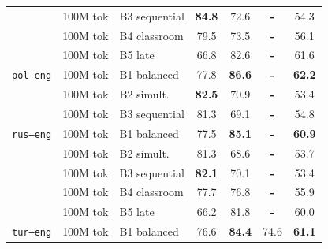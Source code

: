 \documentclass[11pt]{article}
\begin{document}
\begin{table}[ht!]
\begin{minipage}[t]{0.49\linewidth}
\begin{tabular}{ll l cc cc}
 & 100M tok & B3 sequential & \cellcolor[rgb]{0.807,1.000,0.807} \textbf{84.8} & \cellcolor[rgb]{0.877,1.000,0.877} 72.6 & \textbf{-} & \cellcolor[rgb]{0.965,1.000,0.965} 54.3 \\
 & 100M tok & B4 classroom & \cellcolor[rgb]{0.837,1.000,0.837} 79.5 & \cellcolor[rgb]{0.872,1.000,0.872} 73.5 & \textbf{-} & \cellcolor[rgb]{0.950,1.000,0.950} 56.1 \\
 & 100M tok & B5 late & \cellcolor[rgb]{0.907,1.000,0.907} 66.8 & \cellcolor[rgb]{0.822,1.000,0.822} 82.6 & \textbf{-} & \cellcolor[rgb]{0.905,1.000,0.905} 61.6 \\
\midrule
\texttt{pol--eng} & 100M tok & B1 balanced & \cellcolor[rgb]{0.846,1.000,0.846} 77.8 & \cellcolor[rgb]{0.800,1.000,0.800} \textbf{86.6} & \textbf{-} & \cellcolor[rgb]{0.900,1.000,0.900} \textbf{62.2} \\
 & 100M tok & B2 simult. & \cellcolor[rgb]{0.820,1.000,0.820} \textbf{82.5} & \cellcolor[rgb]{0.886,1.000,0.886} 70.9 & \textbf{-} & \cellcolor[rgb]{0.972,1.000,0.972} 53.4 \\
 & 100M tok & B3 sequential & \cellcolor[rgb]{0.827,1.000,0.827} 81.3 & \cellcolor[rgb]{0.896,1.000,0.896} 69.1 & \textbf{-} & \cellcolor[rgb]{0.960,1.000,0.960} 54.8 \\
\midrule
\texttt{rus--eng} & 100M tok & B1 balanced & \cellcolor[rgb]{0.848,1.000,0.848} 77.5 & \cellcolor[rgb]{0.809,1.000,0.809} \textbf{85.1} & \textbf{-} & \cellcolor[rgb]{0.910,1.000,0.910} \textbf{60.9} \\
 & 100M tok & B2 simult. & \cellcolor[rgb]{0.827,1.000,0.827} 81.3 & \cellcolor[rgb]{0.899,1.000,0.899} 68.6 & \textbf{-} & \cellcolor[rgb]{0.970,1.000,0.970} 53.7 \\
 & 100M tok & B3 sequential & \cellcolor[rgb]{0.822,1.000,0.822} \textbf{82.1} & \cellcolor[rgb]{0.890,1.000,0.890} 70.1 & \textbf{-} & \cellcolor[rgb]{0.972,1.000,0.972} 53.4 \\
 & 100M tok & B4 classroom & \cellcolor[rgb]{0.847,1.000,0.847} 77.7 & \cellcolor[rgb]{0.854,1.000,0.854} 76.8 & \textbf{-} & \cellcolor[rgb]{0.951,1.000,0.951} 55.9 \\
 & 100M tok & B5 late & \cellcolor[rgb]{0.910,1.000,0.910} 66.2 & \cellcolor[rgb]{0.827,1.000,0.827} 81.8 & \textbf{-} & \cellcolor[rgb]{0.918,1.000,0.918} 60.0 \\
\midrule
\texttt{tur--eng} & 100M tok & B1 balanced & \cellcolor[rgb]{0.853,1.000,0.853} 76.6 & \cellcolor[rgb]{0.812,1.000,0.812} \textbf{84.4} & \cellcolor[rgb]{0.825,1.000,0.825} 74.6 & \cellcolor[rgb]{0.909,1.000,0.909} \textbf{61.1} \\

\end{tabular}
\end{minipage}
\end{table}
\end{document}
